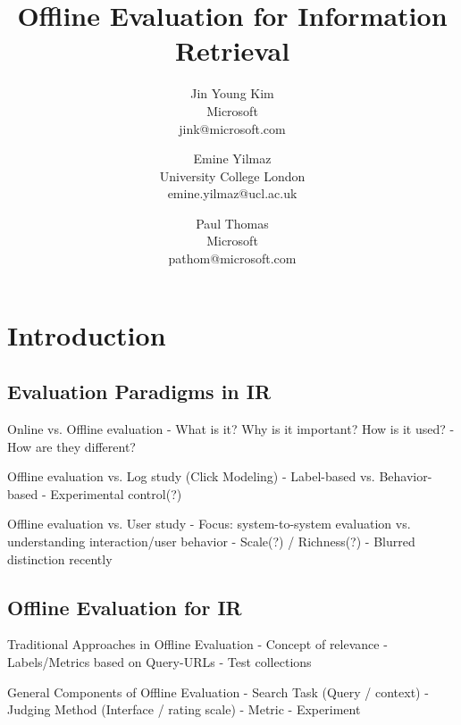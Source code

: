 \documentclass[openany]{now} %
\title{Offline Evaluation for Information Retrieval}
\author{
	Jin Young Kim \\
	Microsoft \\
	jink@microsoft.com
	\and
	Emine Yilmaz \\
	University College London \\
	emine.yilmaz@ucl.ac.uk
	\and
	Paul Thomas \\
	Microsoft \\
	pathom@microsoft.com
}
\begin{document}
	
	
	\frontmatter  %
	
	\maketitle
	
	\tableofcontents
	
	\mainmatter
	
	\begin{abstract}
		
	\end{abstract}
	
	\chapter{Introduction}
	\label{c-intro}
	
	\section{Evaluation Paradigms in IR}
	
	
	Online vs. Offline evaluation
	- What is it? Why is it important? How is it used?
	- How are they different?
	\cite{INR-XYZ}\cite{INR-009} 
	
	Offline evaluation vs. Log study (Click Modeling)
	- Label-based vs. Behavior-based
	- Experimental control(?)
	
	Offline evaluation vs. User study
	- Focus: system-to-system evaluation vs. understanding interaction/user behavior
	- Scale(?) / Richness(?)
	- Blurred distinction recently
	\cite{Bron:2013}
	\cite{Liu:2014}
	\cite{Shah:2011}
	
	
	\section{Offline Evaluation for IR}
	
	Traditional Approaches in Offline Evaluation
	- Concept of relevance 
	- Labels/Metrics based on Query-URLs
	- Test collections 
	\cite{borlund2003} \cite{cleverdon67} \cite{voor:trec05}
	
	General Components of Offline Evaluation
	-	Search Task (Query / context)
	-	Judging Method (Interface / rating scale) 
	-	Metric
	-	Experiment
	
\end{document}
